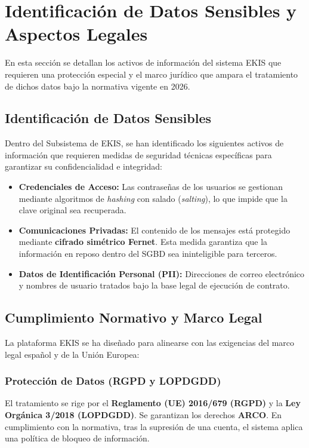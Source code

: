 \chapter{Identificación de Datos Sensibles y Aspectos Legales}

En esta sección se detallan los activos de información del sistema EKIS que requieren una protección especial y el marco jurídico que ampara el tratamiento de dichos datos bajo la normativa vigente en 2026.

\section{Identificación de Datos Sensibles}
Dentro del Subsistema de EKIS, se han identificado los siguientes activos de información que requieren medidas de seguridad técnicas específicas para garantizar su confidencialidad e integridad:

\begin{itemize}
    \item \textbf{Credenciales de Acceso:} Las contraseñas de los usuarios se gestionan mediante algoritmos de \textit{hashing} con salado (\textit{salting}), lo que impide que la clave original sea recuperada.
    \item \textbf{Comunicaciones Privadas:} El contenido de los mensajes está protegido mediante \textbf{cifrado simétrico Fernet}. Esta medida garantiza que la información en reposo dentro del SGBD sea ininteligible para terceros.
    \item \textbf{Datos de Identificación Personal (PII):} Direcciones de correo electrónico y nombres de usuario tratados bajo la base legal de ejecución de contrato.
\end{itemize}



\section{Cumplimiento Normativo y Marco Legal}
La plataforma EKIS se ha diseñado para alinearse con las exigencias del marco legal español y de la Unión Europea:

\subsection{Protección de Datos (RGPD y LOPDGDD)}
El tratamiento se rige por el \textbf{Reglamento (UE) 2016/679 (RGPD)} y la \textbf{Ley Orgánica 3/2018 (LOPDGDD)}. Se garantizan los derechos \textbf{ARCO}. En cumplimiento con la normativa, tras la supresión de una cuenta, el sistema aplica una política de bloqueo de información.

